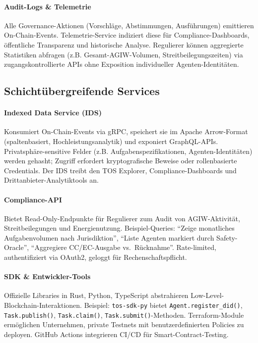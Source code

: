 \documentclass[11pt]{article}
\begin{document}
\paragraph{Audit-Logs \& Telemetrie} Alle Governance-Aktionen (Vorschläge, Abstimmungen, Ausführungen) emittieren On-Chain-Events. Telemetrie-Service indiziert diese für Compliance-Dashboards, öffentliche Transparenz und historische Analyse. Regulierer können aggregierte Statistiken abfragen (z.B. Gesamt-AGIW-Volumen, Streitbeilegungszeiten) via zugangskontrollierte APIs ohne Exposition individueller Agenten-Identitäten.

\subsection{Schichtübergreifende Services}
\paragraph{Indexed Data Service (IDS)} Konsumiert On-Chain-Events via gRPC, speichert sie im Apache Arrow-Format (spaltenbasiert, Hochleistungsanalytik) und exponiert GraphQL-APIs. Privatsphäre-sensitive Felder (z.B. Aufgabenspezifikationen, Agenten-Identitäten) werden gehasht; Zugriff erfordert kryptografische Beweise oder rollenbasierte Credentials. Der IDS treibt den TOS Explorer, Compliance-Dashboards und Drittanbieter-Analytiktools an.

\paragraph{Compliance-API} Bietet Read-Only-Endpunkte für Regulierer zum Audit von AGIW-Aktivität, Streitbeilegungen und Energienutzung. Beispiel-Queries: ``Zeige monatliches Aufgabenvolumen nach Jurisdiktion'', ``Liste Agenten markiert durch Safety-Oracle'', ``Aggregiere CC/EC-Ausgabe vs.\ Rücknahme''. Rate-limited, authentifiziert via OAuth2, geloggt für Rechenschaftspflicht.

\paragraph{SDK \& Entwickler-Tools} Offizielle Libraries in Rust, Python, TypeScript abstrahieren Low-Level-Blockchain-Interaktionen. Beispiel: \texttt{tos-sdk-py} bietet \texttt{Agent.register\_did()}, \texttt{Task.publish()}, \texttt{Task.claim()}, \texttt{Task.submit()}-Methoden. Terraform-Module ermöglichen Unternehmen, private Testnets mit benutzerdefinierten Policies zu deployen. GitHub Actions integrieren CI/CD für Smart-Contract-Testing.
\end{document}
